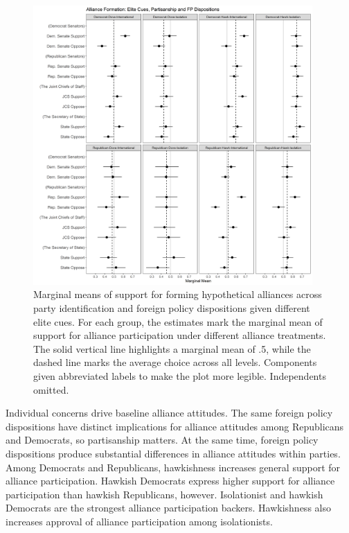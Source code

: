 \documentclass[12pt]{article}
\begin{document}
\begin{figure}[htpb]
	\centering
		\includegraphics[width=0.95\textwidth]{../figures/party-dispo-form-el.png}
	\caption{Marginal means of support for forming hypothetical alliances across party identification and foreign policy dispositions given different elite cues. For each group, the estimates mark the marginal mean of support for alliance participation under different alliance treatments. The solid vertical line highlights a marginal mean of .5, while the dashed line marks the average choice across all levels. Components given abbreviated labels to make the plot more legible. Independents omitted.}
	\label{fig:party-dispo-form-el}
\end{figure}


Individual concerns drive baseline alliance attitudes. 
The same foreign policy dispositions have distinct implications for alliance attitudes among Republicans and Democrats, so partisanship matters.
At the same time, foreign policy dispositions produce substantial differences in alliance attitudes within parties.  
Among Democrats and Republicans, hawkishness increases general support for alliance participation. 
Hawkish Democrats express higher support for alliance participation than hawkish Republicans, however. 
Isolationist and hawkish Democrats are the strongest alliance participation backers. 
Hawkishness also increases approval of alliance participation among isolationists. 
\end{document}
